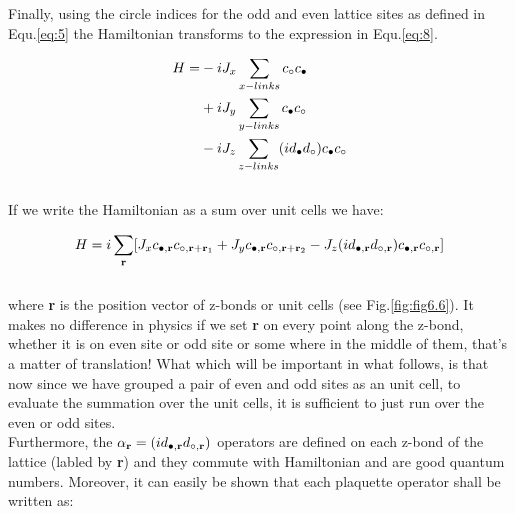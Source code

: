 \documentclass{article}
\begin{document}
\noindent Finally, using the circle indices for the odd and even lattice sites as defined in Equ.\hspace{0.2mm}\ref{eq:5} the Hamiltonian transforms to the expression in Equ.\hspace{0.2mm}\ref{eq:8}.

\begin{equation}\label{eq:8}
	\begin{aligned}
		H= &-iJ_x \sum_{x-links} c_{\circ}c_{\color{black}\bullet}\\
		&+iJ_y \sum_{y-links} c_{\color{black}\bullet}c_{\circ}\\
		&-iJ_z \sum_{z-links} (id_{\color{black}\bullet}d_{\circ})c_{\color{black}\bullet}c_{\circ}\\ 
	\end{aligned}
\end{equation}\\

\noindent If we write the Hamiltonian as a sum over unit cells we have:

\begin{equation}\label{eq:9}
	\begin{aligned}
		H= i\sum_{\textbf{r}}[J_x c_{\color{black}\bullet,\textbf{r}}c_{\circ,\textbf{r}+\textbf{r}_1} + J_y c_{\color{black}\bullet,\textbf{r}}c_{\circ,\textbf{r}+\textbf{r}_2} - J_z (id_{\color{black}\bullet,\textbf{r}}d_{\circ,\textbf{r}})c_{\color{black}\bullet,\textbf{r}}c_{\circ,\textbf{r}}]\\ 
	\end{aligned}
\end{equation}\\

\noindent where \textbf{r} is the position vector of z-bonds or unit cells (see Fig.\hspace{0.2mm}\ref{fig:fig6.6}). It makes no difference in physics if we set \textbf{r} on every point along the z-bond, whether it is on even site or odd site or some where in the middle of them, that's a matter of translation! 
What which will be important in what follows, is that now since we have grouped a pair of even and odd sites as an unit cell, to evaluate the summation over the unit cells, it is sufficient to just run over the even or odd sites.\\
Furthermore, the $\alpha_\textbf{r} = (id_{\color{black}\bullet,\textbf{r}}d_{\circ,\textbf{r}})$ operators are defined on each z-bond of the lattice (labled by \textbf{r}) and they commute with Hamiltonian and are good quantum numbers.
Moreover, it can easily be shown that each plaquette operator shall be written as:
\end{document}
